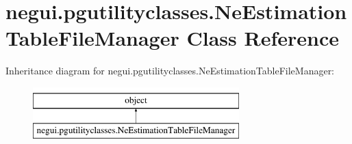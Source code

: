 \hypertarget{classnegui_1_1pgutilityclasses_1_1NeEstimationTableFileManager}{}\section{negui.\+pgutilityclasses.\+Ne\+Estimation\+Table\+File\+Manager Class Reference}
\label{classnegui_1_1pgutilityclasses_1_1NeEstimationTableFileManager}
Inheritance diagram for negui.\+pgutilityclasses.\+Ne\+Estimation\+Table\+File\+Manager\+:\begin{figure}[H]
\begin{center}
\leavevmode
\includegraphics[height=2.000000cm]{classnegui_1_1pgutilityclasses_1_1NeEstimationTableFileManager}
\end{center}
\end{figure}
